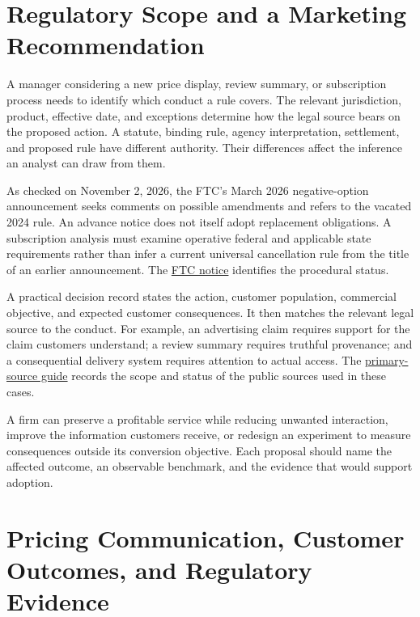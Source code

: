 \hypertarget{M08-regulatory-scope-and-a-marketing-recommendation}{%
\section{Regulatory Scope and a Marketing
Recommendation}\label{M08-regulatory-scope-and-a-marketing-recommendation}}

\noindent \noindent A manager considering a new price display, review summary, or
subscription process needs to identify which conduct a rule covers. The
relevant jurisdiction, product, effective date, and exceptions determine
how the legal source bears on the proposed action. A statute, binding
rule, agency interpretation, settlement, and proposed rule have
different authority. Their differences affect the inference an analyst
can draw from them.

As checked on November 2, 2026, the FTC's March 2026 negative-option
announcement seeks comments on possible amendments and refers to the
vacated 2024 rule. An advance notice does not itself adopt replacement
obligations. A subscription analysis must examine operative federal and
applicable state requirements rather than infer a current universal
cancellation rule from the title of an earlier announcement. The
\href{https://www.ftc.gov/news-events/news/press-releases/2026/03/ftc-seeks-public-comment-response-advance-notice-proposed-rulemaking-regarding-negative-option}{FTC
notice} identifies the procedural status.

A practical decision record states the action, customer population,
commercial objective, and expected customer consequences. It then
matches the relevant legal source to the conduct. For example, an
advertising claim requires support for the claim customers understand; a
review summary requires truthful provenance; and a consequential
delivery system requires attention to actual access. The
\href{../ETHICS_AND_REGULATION.md}{primary-source guide} records the
scope and status of the public sources used in these cases.

A firm can preserve a profitable service while reducing unwanted
interaction, improve the information customers receive, or redesign an
experiment to measure consequences outside its conversion objective.
Each proposal should name the affected outcome, an observable benchmark,
and the evidence that would support adoption.

\hypertarget{M08-pricing-communication-customer-outcomes-and-regulatory-evidence}{%
\section{Pricing Communication, Customer Outcomes, and Regulatory
Evidence}\label{M08-pricing-communication-customer-outcomes-and-regulatory-evidence}}


